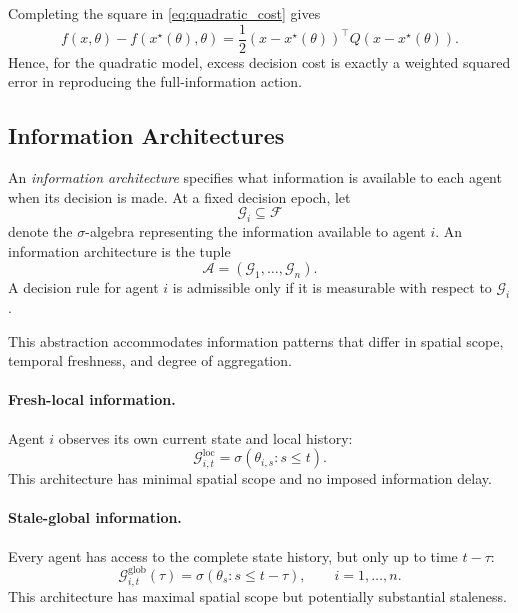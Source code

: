 \documentclass[11pt]{article}
\begin{document}
Completing the square in \eqref{eq:quadratic_cost} gives
\begin{equation}
    f(x,\theta)-f(x^\star(\theta),\theta)
    =
    \frac{1}{2}
    \left(x-x^\star(\theta)\right)^\top
    Q
    \left(x-x^\star(\theta)\right).
    \label{eq:complete_square}
\end{equation}
Hence, for the quadratic model, excess decision cost is exactly a weighted
squared error in reproducing the full-information action.

\subsection{Information Architectures}
\label{subsec:architectures}

An \emph{information architecture} specifies what information is available to
each agent when its decision is made. At a fixed decision epoch, let
\[
    \mathcal{G}_i\subseteq\mathcal{F}
\]
denote the $\sigma$-algebra representing the information available to agent
$i$. An information architecture is the tuple
\begin{equation}
    \mathcal{A}
    =
    (\mathcal{G}_1,\ldots,\mathcal{G}_n).
    \label{eq:architecture}
\end{equation}
A decision rule for agent $i$ is admissible only if it is measurable with
respect to $\mathcal{G}_i$.

This abstraction accommodates information patterns that differ in spatial
scope, temporal freshness, and degree of aggregation.

\paragraph{Fresh-local information.}
Agent $i$ observes its own current state and local history:
\begin{equation}
    \mathcal{G}_{i,t}^{\mathrm{loc}}
    =
    \sigma\!\left(
        \theta_{i,s}:s\le t
    \right).
    \label{eq:fresh_local_arch}
\end{equation}
This architecture has minimal spatial scope and no imposed information delay.

\paragraph{Stale-global information.}
Every agent has access to the complete state history, but only up to time
$t-\tau$:
\begin{equation}
    \mathcal{G}_{i,t}^{\mathrm{glob}}(\tau)
    =
    \sigma\!\left(
        \theta_s:s\le t-\tau
    \right),
    \qquad i=1,\ldots,n.
    \label{eq:stale_global_arch}
\end{equation}
This architecture has maximal spatial scope but potentially substantial
staleness.
\end{document}
